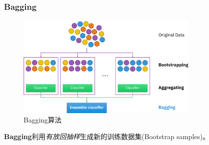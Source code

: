\documentclass[10pt,aspectratio=43,mathserif]{beamer}
\begin{document}
		\begin{frame}
		  \frametitle{\textbf{Bagging}}
            \begin{figure}[!t]
            \centering
            \includegraphics[width=3.5in]{figures/bagging.png}
            \caption{Bagging算法}
            \label{bagging}
            \end{figure}
            \textbf{Bagging}利用\textit{有放回抽样}生成新的训练数据集(Bootstrap samples)。
		\end{frame}
\end{document}

